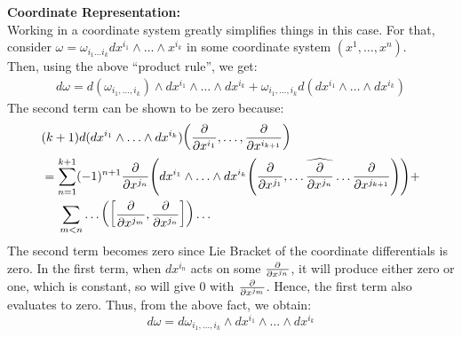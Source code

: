 \textbf{Coordinate Representation:}\\[0.2cm]
Working in a coordinate system greatly simplifies things in this case. For that, consider $\omega = \omega_{i_1\ldots i_k}dx^{i_1}\wedge\ldots\wedge x^{i_k}$ in some coordinate system $(x^1,\ldots,x^n)$.\\[0.2cm]
Then, using the above ``product rule'', we get:
\begin{align*}
    d\omega = d(\omega_{i_1,\ldots,i_{k}})\wedge dx^{i_1}\wedge\ldots\wedge dx^{i_k} + \omega_{i_1,\ldots,i_{k}} d(dx^{i_1}\wedge\ldots\wedge dx^{i_k})
\end{align*}
The second term can be shown to be zero because:
\begin{align*}
    &(k+1)d(dx^{i_1}\wedge \ldots \wedge dx^{i_k}) \qty(\pdv{x^{i_1}},\ldots,\pdv{x^{i_{k+1}}})\\&= \sum\limits_{n=1}^{k+1}(-1)^{n+1}\pdv{x^{j_n}}\qty(dx^{i_1}\wedge \ldots \wedge dx^{i_k}\qty(\pdv{x^{j_1}}, \ldots\widehat{\pdv{x^{j_n}}}\ldots \pdv{x^{j_{k+1}}}))+\\
    &\quad\ \sum\limits_{m<n} \ldots \qty(\left[ \pdv{x^{j_m}}, \pdv{x^{j_n}} \right])\ldots
\end{align*}
The second term becomes zero since Lie Bracket of the coordinate differentials is zero. In the first term, when $dx^{i_n}$ acts on some $\pdv{x^{j_n}}$, it will produce either zero or one, which is constant, so will give 0 with $\pdv{x^{j_m}}$. Hence, the first term also evaluates to zero. Thus, from the above fact, we obtain:
$$d\omega = d\omega_{i_1,\ldots,i_{k}}\wedge dx^{i_1}\wedge\ldots\wedge dx^{i_k}$$
